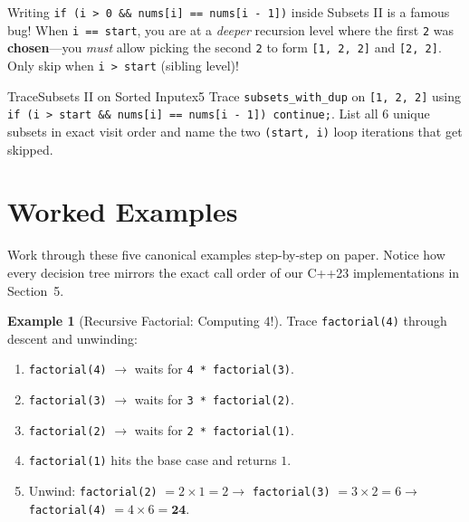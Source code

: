 \documentclass[11pt,a4paper]{article}
\theoremstyle{definition}
\newtheorem{example}{Example}[section]
\begin{document}
\begin{watchoutbox}
Writing \texttt{if (i > 0 \&\& nums[i] == nums[i - 1])} inside Subsets II is a famous bug! When \texttt{i == start}, you are at a \emph{deeper} recursion level where the first \texttt{2} was \textbf{chosen}---you \emph{must} allow picking the second \texttt{2} to form \texttt{[1, 2, 2]} and \texttt{[2, 2]}. Only skip when \texttt{i > start} (sibling level)!
\end{watchoutbox}

\begin{tryitbox}{Trace}{Subsets II on Sorted Input}{ex5}
Trace \texttt{subsets\_with\_dup} on \texttt{[1, 2, 2]} using \texttt{if (i > start \&\& nums[i] == nums[i - 1]) continue;}. List all $6$ unique subsets in exact visit order and name the two \texttt{(start, i)} loop iterations that get skipped.
\end{tryitbox}

\section{Worked Examples}

Work through these five canonical examples step-by-step on paper. Notice how every decision tree mirrors the exact call order of our C++23 implementations in Section~5.

\begin{example}[Recursive Factorial: Computing $4!$]
Trace \texttt{factorial(4)} through descent and unwinding:
\begin{enumerate}
    \item \texttt{factorial(4)} $\to$ waits for \texttt{4 * factorial(3)}.
    \item \texttt{factorial(3)} $\to$ waits for \texttt{3 * factorial(2)}.
    \item \texttt{factorial(2)} $\to$ waits for \texttt{2 * factorial(1)}.
    \item \texttt{factorial(1)} hits the base case and returns $1$.
    \item Unwind: \texttt{factorial(2)} $= 2 \times 1 = 2 \to$ \texttt{factorial(3)} $= 3 \times 2 = 6 \to$ \texttt{factorial(4)} $= 4 \times 6 = \mathbf{24}$.
\end{enumerate}
\end{example}
\end{document}
